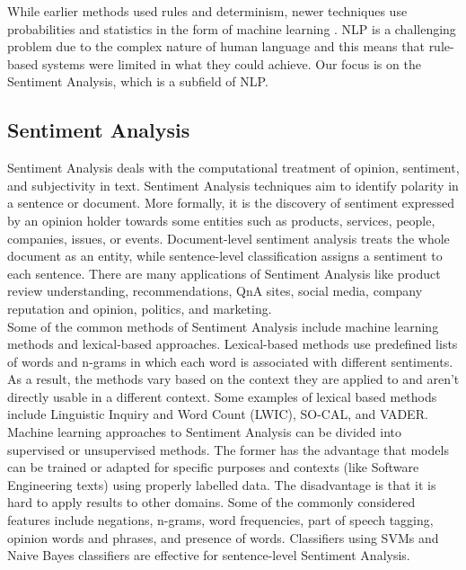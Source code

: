 \documentclass[conference]{IEEEtran}
\begin{document}
While earlier methods used  rules and determinism, newer techniques use probabilities and statistics in the form of machine learning \cite{b8}. NLP is a challenging problem due to the complex nature of human language and this means that rule-based systems were limited in what they could achieve. Our focus is on the Sentiment Analysis, which is a subfield of NLP. \\

\subsection{Sentiment Analysis}
Sentiment Analysis deals with the computational treatment of opinion, sentiment, and subjectivity in text. Sentiment Analysis techniques aim to identify polarity in a sentence or document. More formally, it is the discovery of sentiment expressed by an opinion holder towards some entities such as products, services, people, companies, issues, or events. Document-level sentiment analysis treats the whole document as an entity, while sentence-level classification assigns a sentiment to each sentence. There are many applications of Sentiment Analysis like product review understanding, recommendations, QnA sites, social media, company reputation and opinion, politics, and marketing. \cite{b10, b13, b19}\\

Some of the common methods of Sentiment Analysis include machine learning methods and lexical-based approaches. Lexical-based methods use predefined lists of words and n-grams in which each word is associated with different sentiments. As a result, the methods vary based on the context they are applied to and aren't directly usable in a different context. Some examples of lexical based methods include Linguistic Inquiry and Word Count (LWIC), SO-CAL, and VADER.\cite{b11, b13}\\

Machine learning approaches to Sentiment Analysis can be divided into supervised or unsupervised methods. The former has the advantage that models can be trained or adapted for specific purposes and contexts (like Software Engineering texts) using properly labelled data. The disadvantage is that it is hard to apply results to other domains. Some of the commonly considered features include negations, n-grams, word frequencies, part of speech tagging, opinion words and phrases, and presence of words. Classifiers using SVMs and Naive Bayes classifiers are effective for sentence-level Sentiment Analysis.\cite{b11, b13, b14}\\
\end{document}
